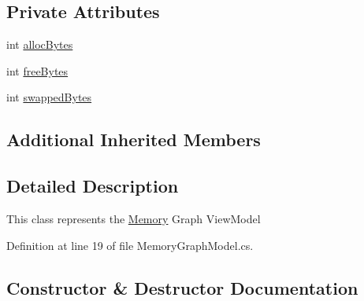 \subsection*{Private Attributes}
\begin{DoxyCompactItemize}
\item 
int \hyperlink{class_c_p_u___o_s___simulator_1_1_controls_1_1_graphs_1_1_view_models_1_1_memory_graph_model_ad28d31dcde87baddb8a89f255495c372}{alloc\+Bytes}
\item 
int \hyperlink{class_c_p_u___o_s___simulator_1_1_controls_1_1_graphs_1_1_view_models_1_1_memory_graph_model_accf22086ffe8ea5126a505ebd5ceeb5a}{free\+Bytes}
\item 
int \hyperlink{class_c_p_u___o_s___simulator_1_1_controls_1_1_graphs_1_1_view_models_1_1_memory_graph_model_ad6bad834377e69a7ea71141e65c15ec7}{swapped\+Bytes}
\end{DoxyCompactItemize}
\subsection*{Additional Inherited Members}


\subsection{Detailed Description}
This class represents the \hyperlink{namespace_c_p_u___o_s___simulator_1_1_memory}{Memory} Graph View\+Model 



Definition at line 19 of file Memory\+Graph\+Model.\+cs.



\subsection{Constructor \& Destructor Documentation}
\hypertarget{class_c_p_u___o_s___simulator_1_1_controls_1_1_graphs_1_1_view_models_1_1_memory_graph_model_a5c4aa222d00594fbf03399f968f834d1}{}
